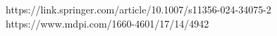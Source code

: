 \subsection{}

https://link.springer.com/article/10.1007/s11356-024-34075-2
https://www.mdpi.com/1660-4601/17/14/4942